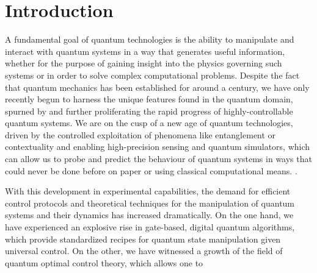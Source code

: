 \chapter{Introduction}

A fundamental goal of quantum technologies is the ability to manipulate and interact with quantum systems in a way that generates useful information, whether for the purpose of gaining insight into the physics governing such systems or in order to solve complex computational problems. Despite the fact that quantum mechanics has been established for around a century, we have only recently begun to harness the unique features found in the quantum domain, spurned by and further proliferating the rapid progress of highly-controllable quantum systems. We are on the cusp of a new age of quantum technologies, driven by the controlled exploitation of phenomena like entanglement or contextuality and enabling high-precision sensing and quantum simulators, which can allow us to probe and predict the behaviour of quantum systems in ways that could never be done before on paper or using classical computational means. . 

With this development in experimental capabilities, the demand for efficient control protocols and theoretical techniques for the manipulation of quantum systems and their dynamics has increased dramatically. On the one hand, we have experienced an explosive rise in gate-based, digital quantum algorithms, which provide standardized recipes for quantum state manipulation given universal control. On the other, we have witnessed a growth of the field of quantum optimal control theory, which allows one to 




